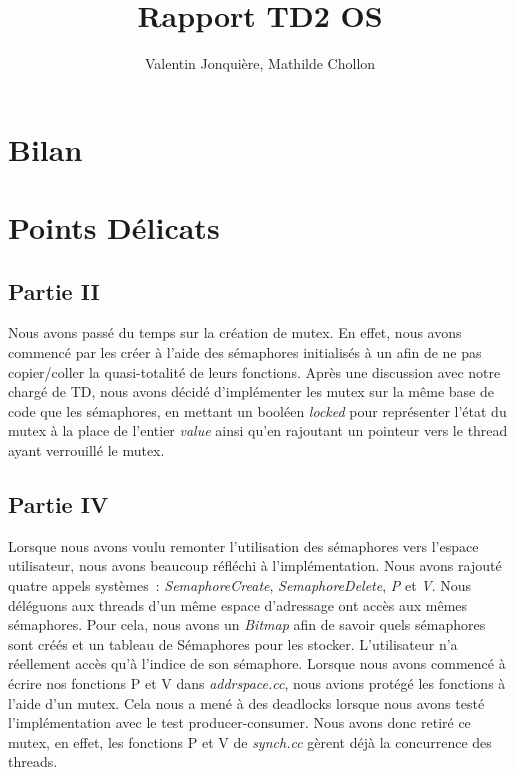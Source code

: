 \documentclass{article}
\author{
    Valentin Jonquière,
    Mathilde Chollon
}
\title{Rapport TD2 OS}
\begin{document}
\maketitle

\pagebreak

\tableofcontents

\pagebreak

\section{Bilan}

\section{Points Délicats}
\subsection{Partie II}
Nous avons passé du temps sur la création de mutex. En effet, nous avons
commencé par les créer à l'aide des sémaphores initialisés à un afin de ne pas
copier/coller la quasi-totalité de leurs fonctions. Après une discussion avec
notre chargé de TD, nous avons décidé d'implémenter les mutex sur la même base
de code que les sémaphores, en mettant un booléen \textit{locked} pour
représenter l'état du mutex à la place de l'entier \textit{value} ainsi qu'en
rajoutant un pointeur vers le thread ayant verrouillé le mutex.

\subsection{Partie IV}
Lorsque nous avons voulu remonter l'utilisation des sémaphores vers l'espace
utilisateur, nous avons beaucoup réfléchi à l'implémentation. Nous avons
rajouté quatre appels systèmes : \textit{SemaphoreCreate},
\textit{SemaphoreDelete}, \textit{P} et \textit{V}. Nous déléguons aux threads
d'un même espace d'adressage ont accès aux mêmes sémaphores. Pour cela, nous
avons un \textit{Bitmap} afin de savoir quels sémaphores sont créés et un
tableau de Sémaphores pour les stocker. L'utilisateur n'a réellement accès qu'à
l'indice de son sémaphore. Lorsque nous avons commencé à écrire nos fonctions P
et V dans \textit{addrspace.cc}, nous avions protégé les fonctions à l'aide
d'un mutex. Cela nous a mené à des deadlocks lorsque nous avons testé
l'implémentation avec le test producer-consumer. Nous avons donc retiré ce
mutex, en effet, les fonctions P et V de \textit{synch.cc} gèrent déjà la
concurrence des threads.
\end{document}
